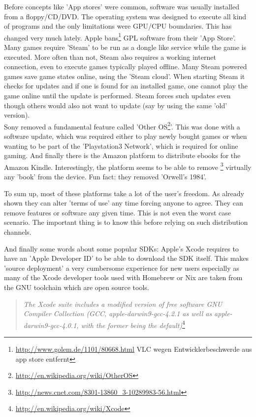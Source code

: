 \documentclass[a4paper,10pt]{article}
\begin{document}
Before concepts like 'App stores' were common, software was usually installed from a floppy/CD/DVD. The operating system was designed to execute all kind of programs and the only limitations were GPU/CPU boundaries. This has changed very much lately. Apple bans\footnote{\url{http://www.golem.de/1101/80668.html} VLC wegen Entwicklerbeschwerde aus app store entfernt} GPL software from their 'App Store'. Many games require 'Steam' to be run as a dongle like service while the game is executed. More often than not, Steam also requires a working internet connection, even to execute games typically played offline. Many Steam powered games save game states online, using the 'Steam cloud'. When starting Steam it checks for updates and if one is found for an installed game, one cannot play the game online until the update is performed. Steam forces such updates even though others would also not want to update (say by using the same 'old' version). \\
Sony removed a fundamental feature called 'Other OS\footnote{\url{http://en.wikipedia.org/wiki/OtherOS}}'. This was done with a software update, which was required either to play newly bought games or when wanting to be part of the 'Playstation3 Network', which is required for online gaming. And finally there is the Amazon platform to distribute ebooks for the Amazon Kindle. Interestingly, the platform seems to be able to remove \footnote{\url{http://news.cnet.com/8301-13860_3-10289983-56.html}} virtually any 'book' from the device. Fun fact: they removed 'Orwell's 1984'.

To sum up, most of these platforms take a lot of the user's freedom. As already shown they can alter 'terms of use' any time forcing anyone to agree. They can remove features or software any given time. This is not even the worst case scenario. The important thing is to know this before relying on such distribution channels.

And finally some words about some popular SDKs: Apple's Xcode requires to have an 'Apple Developer ID' to be able to download the SDK itself. This makes 'source deployment' a very cumbersome experience for new users especially as many of the Xcode developer tools used with Homebrew or Nix are taken from the GNU toolchain which are open source tools. 

\begin{quote}
\textit{The Xcode suite includes a modified version of free software GNU Compiler Collection (GCC, apple-darwin9-gcc-4.2.1 as well as apple-darwin9-gcc-4.0.1, with the former being the default)}\footnote{\url{http://en.wikipedia.org/wiki/Xcode}}
\end{quote}
\end{document}
